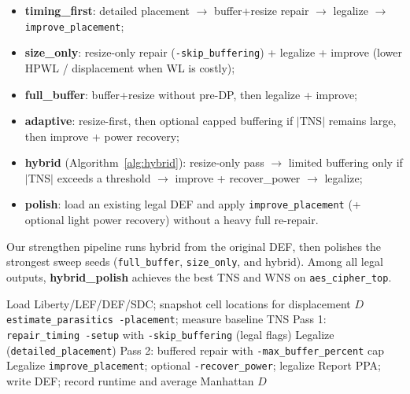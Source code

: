 \documentclass[conference]{IEEEtran}
\begin{document}
\begin{itemize}
    \item \textbf{timing\_first}: detailed placement $\rightarrow$ buffer+resize repair $\rightarrow$ legalize $\rightarrow$ \texttt{improve\_placement};
    \item \textbf{size\_only}: resize-only repair (\texttt{-skip\_buffering}) + legalize + improve (lower HPWL / displacement when WL is costly);
    \item \textbf{full\_buffer}: buffer+resize without pre-DP, then legalize + improve;
    \item \textbf{adaptive}: resize-first, then optional capped buffering if $|$TNS$|$ remains large, then improve + power recovery;
    \item \textbf{hybrid} (Algorithm~\ref{alg:hybrid}): resize-only pass $\rightarrow$ limited buffering only if $|$TNS$|$ exceeds a threshold $\rightarrow$ improve + recover\_power $\rightarrow$ legalize;
    \item \textbf{polish}: load an existing legal DEF and apply \texttt{improve\_placement} (+ optional light power recovery) without a heavy full re-repair.
\end{itemize}

Our strengthen pipeline runs hybrid from the original DEF, then polishes the strongest sweep seeds (\texttt{full\_buffer}, \texttt{size\_only}, and hybrid). Among all legal outputs, \textbf{hybrid\_polish} achieves the best TNS and WNS on \texttt{aes\_cipher\_top}.

\begin{algorithm}
\caption{Hybrid Contest-Legal OpenROAD Driver}
\label{alg:hybrid}
\begin{algorithmic}[1]
\State Load Liberty/LEF/DEF/SDC; snapshot cell locations for displacement $D$
\State \texttt{estimate\_parasitics -placement}; measure baseline TNS
\State Pass 1: \texttt{repair\_timing -setup} with \texttt{-skip\_buffering} (legal flags)
\State Legalize (\texttt{detailed\_placement})
    \State Pass 2: buffered repair with \texttt{-max\_buffer\_percent} cap
    \State Legalize
\EndIf
\State \texttt{improve\_placement}; optional \texttt{-recover\_power}; legalize
\State Report PPA; write DEF; record runtime and average Manhattan $D$
\end{algorithmic}
\end{algorithm}

\end{document}
